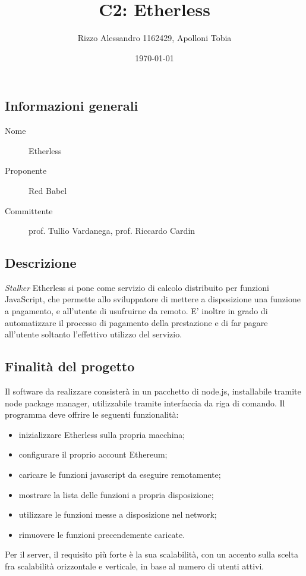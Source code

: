 \documentclass[../studio-di-fattibilita.tex]{subfiles}
\title{C2: Etherless}
\author{Rizzo Alessandro 1162429, Apolloni Tobia}
\date{\today}
\begin{document}
	\subsection{Informazioni generali}
	\label{sec:informazioni_generali}
	\begin{description}
		\item[Nome] Etherless
		\item[Proponente] Red Babel
		\item[Committente] prof. Tullio Vardanega, prof. Riccardo Cardin
	\end{description}
	\subsection{Descrizione}
	\label{sec:descrizione}
	\textit{Stalker} Etherless si pone come servizio di calcolo distribuito per funzioni JavaScript, che permette allo sviluppatore di mettere a disposizione una funzione 
a pagamento, e all'utente di usufruirne da remoto.
E' inoltre in grado di automatizzare il processo di pagamento della prestazione
e di far pagare all'utente soltanto l'effettivo utilizzo del servizio.
	\subsection{Finalità del progetto}
	\label{sec:finalità_del_progetto}
	Il software da realizzare consisterà in un pacchetto di node.js, installabile tramite node package manager, utilizzabile tramite interfaccia da riga di comando.
Il programma deve offrire le seguenti funzionalità:
	\begin{itemize}
		\item inizializzare Etherless sulla propria macchina;
		\item configurare il proprio account Ethereum;
		\item caricare le funzioni javascript da eseguire remotamente;
		\item mostrare la lista delle funzioni a propria disposizione;
		\item utilizzare le funzioni messe a disposizione nel network;
		\item rimuovere le funzioni precendemente caricate.
	\end{itemize}
	Per il server, il requisito più forte è la sua scalabilità, con un accento sulla scelta fra scalabilità orizzontale e verticale, in base al numero di utenti attivi.
\end{document}
